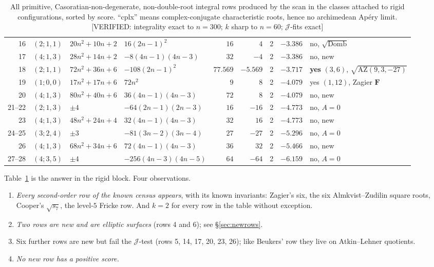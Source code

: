\documentclass[11pt,reqno]{amsart}
\theoremstyle{plain}
\theoremstyle{definition}
\theoremstyle{remark}
\theoremstyle{plain}
\newcommand{\VerifiedR}[1]{\textup{\textsf{[VERIFIED: #1]}}}
\begin{document}
\begin{table}[t]
\begin{tabular}{@{}rlllrrrrl@{}}
16 & $(2;1,1)$ & $20n^2{+}10n{+}2$ & $16(2n{-}1)^2$ & $16$ & $4$ & 2 & $-3.386$ & no, $\sqrt{\text{Domb}}$\\
17 & $(4;1,3)$ & $28n^2{+}14n{+}2$ & $-8(4n{-}1)(4n{-}3)$ & $32$ & $-4$ & 2 & $-3.386$ & no, new\\
18 & $(2;1,1)$ & $72n^2{+}36n{+}6$ & $-108(2n{-}1)^2$ & $77.569$ & $-5.569$ & 2 & $-3.717$ & \textbf{yes} $(3,6)$, $\sqrt{\mathrm{AZ}(9,3,-27)}$\\
19 & $(1;0,0)$ & $17n^2{+}17n{+}6$ & $72n^2$ & $9$ & $8$ & 2 & $-4.079$ & yes $(1,12)$, Zagier $\mathbf F$\\
20 & $(4;1,3)$ & $80n^2{+}40n{+}6$ & $36(4n{-}1)(4n{-}3)$ & $72$ & $8$ & 2 & $-4.079$ & no, new\\
21--22 & $(2;1,3)$ & $\pm4$ & $-64(2n{-}1)(2n{-}3)$ & $16$ & $-16$ & 2 & $-4.773$ & no, $A=0$\\
23 & $(4;1,3)$ & $48n^2{+}24n{+}4$ & $32(4n{-}1)(4n{-}3)$ & $32$ & $16$ & 2 & $-4.773$ & no, new\\
24--25 & $(3;2,4)$ & $\pm3$ & $-81(3n{-}2)(3n{-}4)$ & $27$ & $-27$ & 2 & $-5.296$ & no, $A=0$\\
26 & $(4;1,3)$ & $68n^2{+}34n{+}6$ & $72(4n{-}1)(4n{-}3)$ & $36$ & $32$ & 2 & $-5.466$ & no, new\\
27--28 & $(4;3,5)$ & $\pm4$ & $-256(4n{-}3)(4n{-}5)$ & $64$ & $-64$ & 2 & $-6.159$ & no, $A=0$\\
\hline
\end{tabular}
\medskip
\caption{All primitive, Casoratian-non-degenerate, non-double-root integral rows
produced by the scan in the classes attached to rigid configurations, sorted by
score. ``cplx'' means complex-conjugate characteristic roots, hence no
archimedean Ap\'ery limit. \VerifiedR{integrality exact to $n=300$; $k$ sharp to
$n=60$; $\mathcal J$-fits exact}}\label{tab:rows}
\end{table}

Table~\ref{tab:rows} is the answer in the rigid block. Four observations.

\begin{enumerate}[label=\textup{(\arabic*)},leftmargin=2.6em]
\item \emph{Every second-order row of the known census appears}, with its known
invariants: Zagier's six, the six Almkvist--Zudilin square roots, Cooper's
$\sqrt{s_7}$, the level-$5$ Fricke row. And $k=2$ for every row in the table
without exception.
\item \emph{Two rows are new and are elliptic surfaces} (rows 4 and 6);
see \S\ref{sec:newrows}.
\item Six further rows are new but fail the $\mathcal J$-test (rows 5, 14, 17,
20, 23, 26); like Beukers' row they live on Atkin--Lehner quotients.
\item \emph{No new row has a positive score.}
\end{enumerate}
\end{document}
